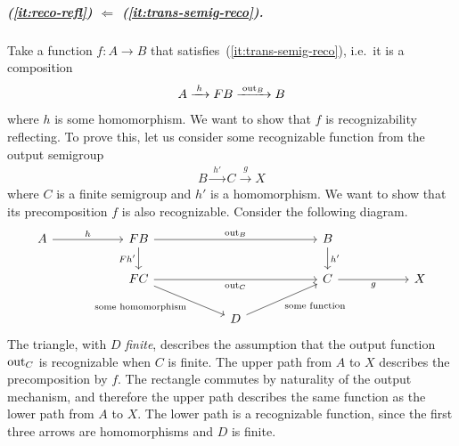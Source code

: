     
\subparagraph{
     (\ref{it:reco-refl}) $\Leftarrow$ (\ref{it:trans-semig-reco}).} Take a function $f : A \to B$ that satisfies~(\ref{it:trans-semig-reco}), i.e.~it is a composition 
\begin{align*}
    A \xrightarrow{\;h\;} \functor B \xrightarrow{\;\outfun_B\;} B
\end{align*}
where $h$ is some homomorphism.
We want to show that $f$ is recognizability reflecting. To prove this, let us
consider some recognizable function from the output semigroup 
\begin{align*}
    B \xrightarrow{\;h'\;} C \xrightarrow{\;g\;} X
\end{align*}
where $C$ is a finite semigroup and $h'$ is a homomorphism.
We want to show that its precomposition $f$ is also recognizable. Consider the following diagram. 
\[\begin{tikzcd}
    [column sep=2cm]
	A & {\functor B} & & B \\
	& {\functor C} & & C & X\\
    & & D
	\arrow["h", from=1-1, to=1-2]
	\arrow["\outfun_B", from=1-2, to=1-4]
	\arrow["{\functor h'}"', from=1-2, to=2-2]
	\arrow["\outfun_C"', from=2-2, to=2-4]
	\arrow["h'", from=1-4, to=2-4]
	\arrow["g"', from=2-4, to=2-5]
    \arrow["\text{some homomorphism}"', from=2-2, to=3-3]
    \arrow["\text{some function}"', from=3-3, to=2-4]
\end{tikzcd}\]
The triangle, with $D$ \emph{finite}, describes  the assumption that the output function $\mathrm{out}_C$ is recognizable when $C$ is finite.
The upper path from $A$ to $X$ describes the precomposition by $f$. 
 The  rectangle commutes by naturality of the output mechanism, and therefore the upper path describes the same function as the lower path from $A$ to $X$. The lower path is a recognizable function, since the first three arrows are homomorphisms and $D$ is finite.
